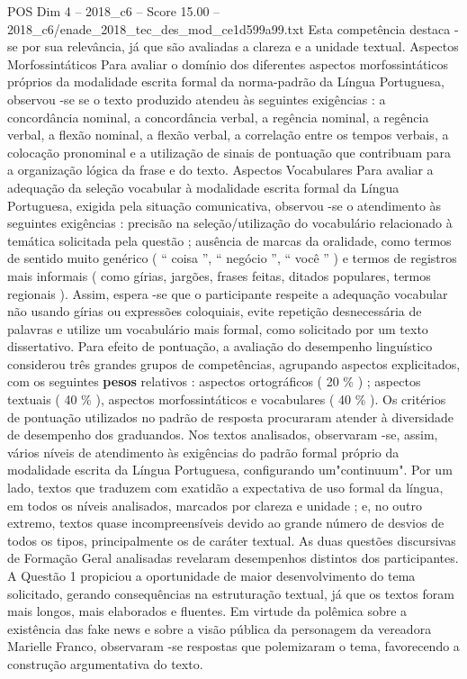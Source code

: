 \begin{textsample}{POS Dim 4 – 2018\_c6 – Score 15.00 – 2018\_c6/enade\_2018\_tec\_des\_mod\_ce1d599a99.txt}
Esta competência destaca -se por sua relevância, já que são avaliadas a clareza e a unidade textual.
Aspectos Morfossintáticos Para avaliar o domínio dos diferentes aspectos morfossintáticos próprios da modalidade escrita formal da norma-padrão da Língua Portuguesa, observou -se se o texto produzido atendeu às seguintes exigências : a concordância nominal, a concordância verbal, a regência nominal, a regência verbal, a flexão nominal, a flexão verbal, a correlação entre os tempos verbais, a colocação pronominal e a utilização de sinais de pontuação que contribuam para a organização lógica da frase e do texto.
Aspectos Vocabulares Para avaliar a adequação da seleção vocabular à modalidade escrita formal da Língua Portuguesa, exigida pela situação comunicativa, observou -se o atendimento às seguintes exigências : precisão na seleção/utilização do vocabulário relacionado à temática solicitada pela questão ; ausência de marcas da oralidade, como termos de sentido muito genérico ( “ coisa ”, “ negócio ”, “ você ” ) e termos de registros mais informais ( como gírias, jargões, frases feitas, ditados populares, termos regionais ).
Assim, espera -se que o participante respeite a adequação vocabular não usando gírias ou expressões coloquiais, evite repetição desnecessária de palavras e utilize um vocabulário mais formal, como solicitado por um texto dissertativo.
Para efeito de pontuação, a avaliação do desempenho linguístico considerou três grandes grupos de competências, agrupando aspectos explicitados, com os seguintes \textbf{pesos} relativos : aspectos ortográficos ( 20 \% ) ; aspectos textuais ( 40 \% ), aspectos morfossintáticos e vocabulares ( 40 \% ).
Os critérios de pontuação utilizados no padrão de resposta procuraram atender à diversidade de desempenho dos graduandos.
Nos textos analisados, observaram -se, assim, vários níveis de atendimento às exigências do padrão formal próprio da modalidade escrita da Língua Portuguesa, configurando um"continuum".
Por um lado, textos que traduzem com exatidão a expectativa de uso formal da língua, em todos os níveis analisados, marcados por clareza e unidade ; e, no outro extremo, textos quase incompreensíveis devido ao grande número de desvios de todos os tipos, principalmente os de caráter textual.
As duas questões discursivas de Formação Geral analisadas revelaram desempenhos distintos dos participantes.
A Questão 1 propiciou a oportunidade de maior desenvolvimento do tema solicitado, gerando consequências na estruturação textual, já que os textos foram mais longos, mais elaborados e fluentes.
Em virtude da polêmica sobre a existência das fake news e sobre a visão pública da personagem da vereadora Marielle Franco, observaram -se respostas que polemizaram o tema, favorecendo a construção argumentativa do texto.

\end{textsample}
